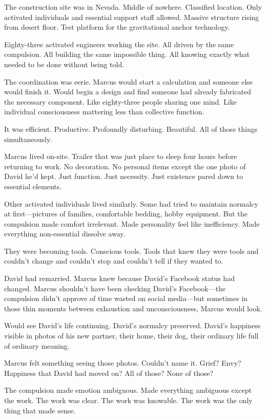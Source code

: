 The construction site was in Nevada. Middle of nowhere. Classified location. Only activated individuals and essential support staff allowed. Massive structure rising from desert floor. Test platform for the gravitational anchor technology.

Eighty-three activated engineers working the site. All driven by the same compulsion. All building the same impossible thing. All knowing exactly what needed to be done without being told.

The coordination was eerie. Marcus would start a calculation and someone else would finish it. Would begin a design and find someone had already fabricated the necessary component. Like eighty-three people sharing one mind. Like individual consciousness mattering less than collective function.

It was efficient. Productive. Profoundly disturbing. Beautiful. All of those things simultaneously.

Marcus lived on-site. Trailer that was just place to sleep four hours before returning to work. No decoration. No personal items except the one photo of David he'd kept. Just function. Just necessity. Just existence pared down to essential elements.

Other activated individuals lived similarly. Some had tried to maintain normalcy at first—pictures of families, comfortable bedding, hobby equipment. But the compulsion made comfort irrelevant. Made personality feel like inefficiency. Made everything non-essential dissolve away.

They were becoming tools. Conscious tools. Tools that knew they were tools and couldn't change and couldn't stop and couldn't tell if they wanted to.

\scenebreak

David had remarried. Marcus knew because David's Facebook status had changed. Marcus shouldn't have been checking David's Facebook—the compulsion didn't approve of time wasted on social media—but sometimes in those thin moments between exhaustion and unconsciousness, Marcus would look.

Would see David's life continuing. David's normalcy preserved. David's happiness visible in photos of his new partner, their home, their dog, their ordinary life full of ordinary meaning.

Marcus felt something seeing those photos. Couldn't name it. Grief? Envy? Happiness that David had moved on? All of those? None of those?

The compulsion made emotion ambiguous. Made everything ambiguous except the work. The work was clear. The work was knowable. The work was the only thing that made sense.

